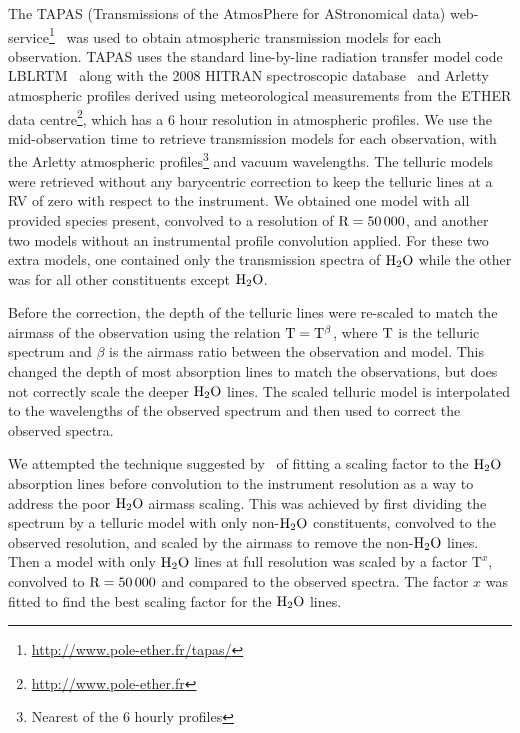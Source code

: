 \documentclass[fleqn,usenatbib]{mnras}
\newcommand*\bl{\color{blue}}
\begin{document}
    The TAPAS (Transmissions of the AtmosPhere for AStronomical data) web-service\footnote{\url{http://www.pole-ether.fr/tapas/}}~\citep{bertaux_tapas_2014} was used to obtain atmospheric transmission models for each observation. TAPAS uses the standard line-by-line radiation transfer model code LBLRTM~\citep{clough_linebyline_1995} along with the 2008 HITRAN spectroscopic database~\citep{rothman_hitran_2009} and Arletty atmospheric profiles derived using meteorological measurements from the ETHER data centre\footnote{\url{http://www.pole-ether.fr}}, which has a 6 hour resolution in atmospheric profiles.
    We use the mid-observation time to retrieve transmission models for each observation, with the Arletty atmospheric profiles\footnote{Nearest of the 6 hourly profiles} and vacuum wavelengths. The telluric models were retrieved without any barycentric correction to keep the telluric lines at a RV of zero with respect to the instrument. We obtained one model with all provided species present, convolved to a resolution of \(\rm R=50\,000\), and another two models without an instrumental profile convolution applied. For these two extra models, one contained only the transmission spectra of \(\rm H_{2}O\) while the other was for all other constituents except \(\rm H_{2}O\).
    
    Before the correction, the depth of the telluric lines were re-scaled to match the airmass of the observation using the relation \(\rm T = T^{\beta}\), where \(\rm T\) is the telluric spectrum and \(\beta\) is the airmass ratio between the observation and model. This changed the depth of most absorption lines to match the observations, but does not correctly scale the deeper \(\rm H_{2}O\) lines. The scaled telluric model is interpolated to the wavelengths of the observed spectrum and then used to correct the observed spectra. 
    
    {\bl We attempted the technique suggested by~\citet{bertaux_tapas_2014} of fitting a scaling factor to the \(\rm {H}_{2}O\) absorption lines before convolution to the instrument resolution as a way to address the poor \(\rm H_{2}O\) airmass scaling.} This was achieved by first dividing the spectrum by a telluric model with only non-\(\rm H_{2}O\) constituents, convolved to the observed resolution, and scaled by the airmass to remove the non-\(\rm H_{2}O\) lines. Then a model with only \(\rm H_{2}O\) lines at full resolution was scaled by a factor \(\textrm{T}^{x}\), convolved to \(\rm R=50\,000\) and compared to the observed spectra. The factor \(x\) was fitted to find the best scaling factor for the \(\rm H_{2}O\) lines.
    
\end{document}
